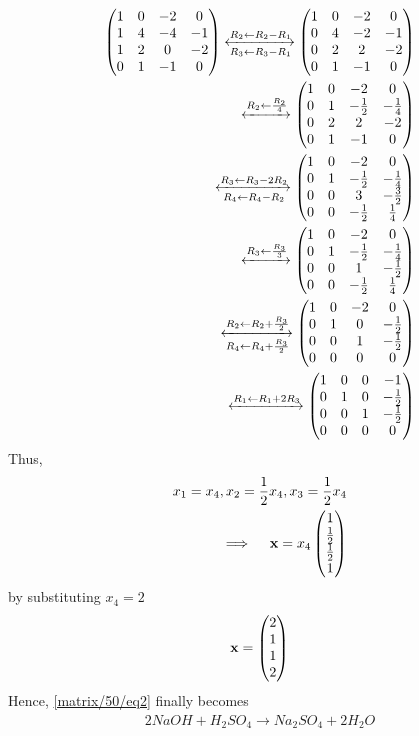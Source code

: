 \begin{align}
    \begin{pmatrix} 1 & 0 & -2 & 0\\
           1 & 4 & -4 & -1\\
           1 & 2 & 0 & -2\\
           0 & 1 & -1 & 0\end{pmatrix}
    \xleftrightarrow[R_{3}\leftarrow R_3-R_{1}]{R_{2}\leftarrow R_2- R_1}
    \begin{pmatrix} 1 & 0 & -2 & 0\\
           0 & 4 & -2 & -1\\
           0 & 2 & 2 & -2\\
           0 & 1 & -1 & 0\end{pmatrix}\\
    \xleftrightarrow{R_2 \leftarrow \frac{R_2}{4}}
    \begin{pmatrix} 1 & 0 & -2 & 0\\
          0 & 1 & -\frac{1}{2} & -\frac{1}{4}\\
          0 & 2 & 2 & -2\\
          0 & 1 & -1 & 0\end{pmatrix}\\
    \xleftrightarrow[R_4 \leftarrow R_4 - R_2]{R_3 \leftarrow R_3 - 2R_2}
    \begin{pmatrix} 1 & 0 & -2 & 0\\
           0 & 1 & -\frac{1}{2} & -\frac{1}{4}\\
           0 & 0 & 3 & -\frac{3}{2}\\
           0 & 0 & -\frac{1}{2} & \frac{1}{4}\end{pmatrix}\\
    \xleftrightarrow{R_3 \leftarrow \frac{R_3}{3}}
    \begin{pmatrix} 1 & 0 & -2 & 0\\
           0 & 1 & -\frac{1}{2} & -\frac{1}{4}\\
           0 & 0 & 1 & -\frac{1}{2}\\
           0 & 0 & -\frac{1}{2} & \frac{1}{4}\end{pmatrix}\\
    \xleftrightarrow[R_{4}\leftarrow R_4+\frac{R_3}{2}]{R_{2}\leftarrow R_2+ \frac{R_3}{2}}
    \begin{pmatrix} 1 & 0 & -2 & 0\\
           0 & 1 & 0 & -\frac{1}{2}\\
           0 & 0 & 1 & -\frac{1}{2}\\
           0 & 0 & 0 & 0\end{pmatrix}\\
    \xleftrightarrow{R_1 \leftarrow R_1+2R_3}
    \begin{pmatrix} 1 & 0 & 0 & -1\\
           0 & 1 & 0 & -\frac{1}{2}\\
           0 & 0 & 1 & -\frac{1}{2}\\
           0 & 0 & 0 & 0\end{pmatrix}
\end{align}
Thus,
\begin{align}
    x_1=x_4, x_2= \frac{1}{2}x_4, x_3=\frac{1}{2}x_4\\
    \implies \quad\mathbf{x}= x_4\begin{pmatrix} 1\\ \frac{1}{2}\\ \frac{1}{2}\\1\end{pmatrix} 
\end{align} 
by substituting $x_4= 2$
\begin{align}
    \mathbf{x}=\begin{pmatrix} 2\\1\\1\\2\end{pmatrix}
\end{align}
Hence, \eqref{matrix/50/eq2} finally becomes
\begin{align}
    2 NaOH + H_2SO_4 \xrightarrow{} 
    Na_2SO_4 + 2 H_2O
\end{align}
